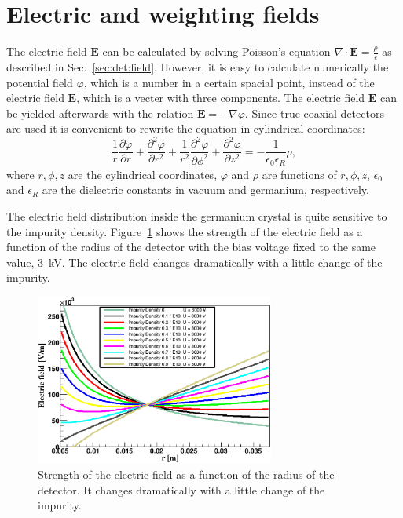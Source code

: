 \section{Electric and weighting fields}
\label{sec:pss:field}
The electric field $\mathbf{E}$ can be calculated by solving Poisson's equation $\nabla \cdot \mathbf{E} = \frac{\rho}{\epsilon}$ as described in Sec.~\ref{sec:det:field}. However, it is easy to calculate numerically the potential field $\varphi$, which is a number in a certain spacial point, instead of the electric field $\mathbf{E}$, which is a vecter with three components. The electric field $\mathbf{E}$ can be yielded afterwards with the relation $\mathbf{E} = - \nabla \varphi$. Since true coaxial detectors are used it is convenient to rewrite the equation in cylindrical coordinates:
\begin{equation}
\frac{1}{r} \frac{\partial \varphi}{\partial r} + \frac{\partial^{2} \varphi}{\partial r^{2}} + \frac{1}{r^{2}} \frac{\partial^{2} \varphi}{\partial \phi^{2}} +
\frac{\partial^{2} \varphi}{\partial z^{2}} = - \frac{1}{\epsilon_{0}
\epsilon_{R}} \rho,
\label{eq:pss:pocyl}
\end{equation}
where $r, \phi, z$ are the cylindrical coordinates, $\varphi$ and $\rho$ are functions of $r, \phi, z$, $\epsilon_{0}$ and $\epsilon_{R}$ are the dielectric constants in vacuum and germanium, respectively.

The electric field distribution inside the germanium crystal is quite sensitive to the impurity density. Figure~\ref{fig:pss:rho} shows the strength of the electric field as a function of the radius of the detector with the bias voltage fixed to the same value, 3~kV. The electric field changes dramatically with a little change of the impurity.

\begin{figure}[htbp]
\centering
\includegraphics[width=0.7\textwidth]{rho}
\caption{Strength of the electric field as a function of the radius of the detector. It changes dramatically with a little change of the impurity.}
\label{fig:pss:rho}
\end{figure}

